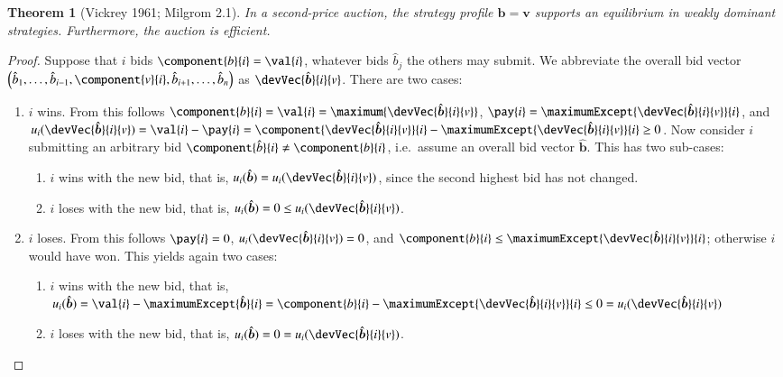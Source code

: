 \documentclass[12pt,a4paper]{scrartcl}
\newtheorem{theorem}{Theorem}
\theoremstyle{remark} %
\begin{document}
\begin{module}[id=vickrey]
  \begin{theorem}[Vickrey 1961; Milgrom 2.1]
    In a second-price auction, the strategy profile $\bm{b} = \bm{v}$ supports an equilibrium in weakly dominant strategies.  Furthermore, the auction is efficient.
  \end{theorem}


  \begin{proof}
    Suppose that \participant $i$ bids $\component{b}{i} = \val{i}$, whatever bids $\hat{b}_j$ the others may submit.  We abbreviate the overall bid vector $\left( \hat{b}_1, \ldots, \hat{b}_{i-1}, \component{v}{i}, \hat{b}_{i+1}, \ldots, \hat{b}_n \right)$ as $\devVec{\hat{\bm{b}}}{i}{v}$.  There are two cases:
    \begin{enumerate}
    \item {\capitalize\participant} $i$ wins. From this follows  $\component{b}{i}  = \val{i} = \maximum{\devVec{\hat{\bm{b}}}{i}{v}}$, $\pay{i} = \maximumExcept{\devVec{\hat{\bm{b}}}{i}{v}}{i}$,
      and $u_i(\devVec{\hat{\bm{b}}}{i}{v}) = \val{i} - \pay{i} = \component{\devVec{\hat{\bm{b}}}{i}{v}}{i} - \maximumExcept{\devVec{\hat{\bm{b}}}{i}{v}}{i} \ge 0$.  Now consider $i$ submitting an arbitrary bid $\component{\hat{b}}{i} \ne \component{b}{i}$, i.e.\ assume an overall bid vector $\hat{\bm{b}}$.  This has two sub-cases:
      \begin{enumerate}
      \item $i$ wins with the new bid, that is, $u_i(\hat{\bm{b}}) = u_i(\devVec{\hat{\bm{b}}}{i}{v})$,
        since the second highest bid has not changed.
      \item $i$ loses with the new bid, that is, $u_i(\hat{\bm{b}}) = 0 \le u_i(\devVec{\hat{\bm{b}}}{i}{v})$.
      \end{enumerate}

    \item {\capitalize\participant} $i$ loses. From this follows  $\pay{i} = 0$, $u_i(\devVec{\hat{\bm{b}}}{i}{v}) = 0$, and
      $\component{b}{i} \le \maximumExcept{\devVec{\hat{\bm{b}}}{i}{v}}{i}$; otherwise $i$ would have won. This yields
      again two cases:
      \begin{enumerate}
      \item $i$ wins with the new bid, that is,
        $u_i(\hat{\bm{b}}) = \val{i} - \maximumExcept{\hat{\bm{b}}}{i} = \component{b}{i} - \maximumExcept{\devVec{\hat{\bm{b}}}{i}{v}}{i}  \le 0 = u_i(\devVec{\hat{\bm{b}}}{i}{v})$
      \item $i$ loses with the new bid, that is, $u_i(\hat{\bm{b}}) = 0 = u_i(\devVec{\hat{\bm{b}}}{i}{v})$.
      \end{enumerate}
   \end{enumerate}


\end{proof}
\end{module}
\end{document}
